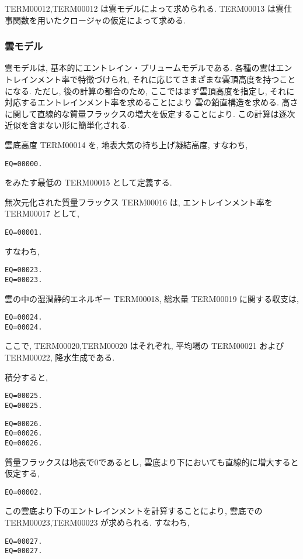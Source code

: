 TERM00012,TERM00012 は雲モデルによって求められる.
TERM00013 は雲仕事関数を用いたクロージャの仮定によって求める.

\subsubsection{雲モデル}

雲モデルは, 基本的にエントレイン・プリュームモデルである.
各種の雲はエントレインメント率で特徴づけられ,
それに応じてさまざまな雲頂高度を持つことになる.
ただし, 後の計算の都合のため, 
ここではまず雲頂高度を指定し, 
それに対応するエントレインメント率を求めることにより
雲の鉛直構造を求める.
高さに関して直線的な質量フラックスの増大を仮定することにより.
この計算は逐次近似を含まない形に簡単化される.

雲底高度 TERM00014 を, 
地表大気の持ち上げ凝結高度, すなわち,
\begin{verbatim}
EQ=00000.
\end{verbatim}
をみたす最低の TERM00015 として定義する.

無次元化された質量フラックス TERM00016 は, 
エントレインメント率を TERM00017 として,
\begin{verbatim}
EQ=00001.
\end{verbatim}
すなわち,
\begin{verbatim}
EQ=00023.
EQ=00023.
\end{verbatim}

雲の中の湿潤静的エネルギー TERM00018, 総水量 TERM00019 に関する収支は,
\begin{verbatim}
EQ=00024.
EQ=00024.
\end{verbatim}
ここで, TERM00020,TERM00020 はそれぞれ,
平均場の TERM00021 および TERM00022, 降水生成である.

積分すると,
\begin{verbatim}
EQ=00025.
EQ=00025.
\end{verbatim}
\begin{verbatim}
EQ=00026.
EQ=00026.
EQ=00026.
\end{verbatim}

質量フラックスは地表で0であるとし,
雲底より下においても直線的に増大すると仮定する,
\begin{verbatim}
EQ=00002.
\end{verbatim}
この雲底より下のエントレインメントを計算することにより,
雲底での TERM00023,TERM00023 が求められる. すなわち,
\begin{verbatim}
EQ=00027.
EQ=00027.
\end{verbatim}

